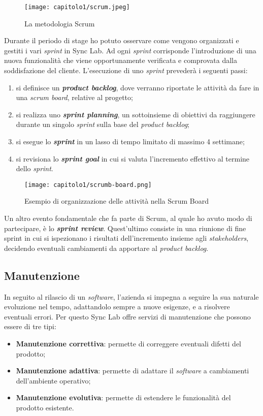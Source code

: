 \clearpage

\begin{figure}[h!]
  \centering
  \texttt{[image: capitolo1/scrum.jpeg]}
  \caption{La metodologia Scrum}
\end{figure}

Durante il periodo di stage ho potuto osservare come vengono organizzati e gestiti i vari \emph{sprint} in Sync Lab. Ad ogni \emph{sprint} corrisponde l'introduzione di una nuova funzionalità che viene opportunamente verificata e comprovata dalla soddisfazione del cliente. L'esecuzione di uno \emph{sprint} prevederà i seguenti passi:
\begin{enumerate}
  \item si definisce un \textbf{\emph{product backlog}}, dove verranno riportate le attività da fare in una \emph{scrum board}, relative al progetto;
  \item si realizza uno \textbf{\emph{sprint planning}}, un sottoinsieme di obiettivi da raggiungere durante un singolo \emph{sprint} sulla base del \emph{product backlog};
  \item si esegue lo \textbf{\emph{sprint}} in un lasso di tempo limitato di massimo 4 settimane;
  \item si revisiona lo \textbf{\emph{sprint goal}} in cui si valuta l'incremento effettivo al termine dello \emph{sprint}.
\end{enumerate}


\begin{figure}[h!]
  \centering
  \texttt{[image: capitolo1/scrumb-board.png]}
  \caption{Esempio di organizzazione delle attività nella Scrum Board}
\end{figure}

Un altro evento fondamentale che fa parte di Scrum, al quale ho avuto modo di partecipare, è lo \textbf{\emph{sprint review}}. Quest'ultimo consiste in una riunione di fine sprint in cui si ispezionano i risultati dell'incremento insieme agli \emph{stakeholders}, decidendo eventuali cambiamenti da apportare al \emph{product backlog}. \\

\subsection{Manutenzione}
In seguito al rilascio di un \emph{software}, l'azienda si impegna a seguire la sua naturale evoluzione nel tempo, adattandolo sempre a nuove esigenze, e a risolvere eventuali errori. Per questo Sync Lab offre servizi di manutenzione che possono essere di tre tipi:
\begin{itemize}
  \item \textbf{Manutenzione correttiva}: permette di correggere eventuali difetti del prodotto;
  \item \textbf{Manutenzione adattiva}: permette di adattare il \emph{software} a cambiamenti dell'ambiente operativo;
  \item \textbf{Manutenzione evolutiva}: permette di estendere le funzionalità del prodotto esistente.
\end{itemize}

